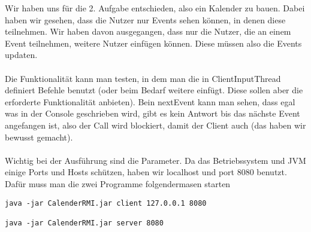 Wir haben uns für die 2. Aufgabe entschieden, also ein Kalender zu bauen. Dabei haben wir gesehen, dass die Nutzer nur Events sehen können, in denen diese teilnehmen. Wir haben davon ausgegangen, dass nur die Nutzer, die an einem Event teilnehmen, weitere Nutzer einfügen können. Diese müssen also die Events updaten. \\ \\

Die Funktionalität kann man testen, in dem man die in ClientInputThread definiert Befehle benutzt (oder beim Bedarf weitere einfügt. Diese sollen aber die erforderte Funktionalität anbieten). Bein nextEvent kann man sehen, dass egal was in der Console geschrieben wird, gibt es kein Antwort bis das nächste Event angefangen ist, also der Call wird blockiert, damit der Client auch (das haben wir bewusst gemacht). \\ \\

Wichtig bei der Ausführung sind die Parameter. Da das Betriebssystem und JVM einige Ports und Hosts schützen, haben wir localhost und port 8080 benutzt. Dafür muss man die zwei Programme folgendermasen starten

\begin{lstlisting}
java -jar CalenderRMI.jar client 127.0.0.1 8080

java -jar CalenderRMI.jar server 8080
\end{lstlisting}


